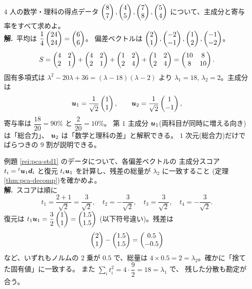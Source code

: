 \begin{rei}\label{rei:pca-std1}
$4$ 人の数学・理科の得点データ
$\begin{pmatrix}8 \\ 7\end{pmatrix}, \begin{pmatrix}4 \\ 5\end{pmatrix}, \begin{pmatrix}7 \\ 8\end{pmatrix}, \begin{pmatrix}5 \\ 4\end{pmatrix}$
について、主成分と寄与率をすべて求めよ。\\
\textbf{解.}\ 平均は $\dfrac{1}{4}\begin{pmatrix}24 \\ 24\end{pmatrix} = \begin{pmatrix}6 \\ 6\end{pmatrix}$。
偏差ベクトルは
$\begin{pmatrix}2 \\ 1\end{pmatrix}, \begin{pmatrix}-2 \\ -1\end{pmatrix}, \begin{pmatrix}1 \\ 2\end{pmatrix}, \begin{pmatrix}-1 \\ -2\end{pmatrix}$。
\[
S = \begin{pmatrix}4 & 2 \\ 2 & 1\end{pmatrix} + \begin{pmatrix}4 & 2 \\ 2 & 1\end{pmatrix}
+ \begin{pmatrix}1 & 2 \\ 2 & 4\end{pmatrix} + \begin{pmatrix}1 & 2 \\ 2 & 4\end{pmatrix}
= \begin{pmatrix}10 & 8 \\ 8 & 10\end{pmatrix}.
\]
固有多項式は $\lambda^2 - 20\lambda + 36 = (\lambda - 18)(\lambda - 2)$
より $\lambda_1 = 18$, $\lambda_2 = 2$。主成分は
\[
\bm{u}_1 = \frac{1}{\sqrt{2}}\begin{pmatrix}1 \\ 1\end{pmatrix}, \qquad
\bm{u}_2 = \frac{1}{\sqrt{2}}\begin{pmatrix}1 \\ -1\end{pmatrix},
\]
寄与率は $\dfrac{18}{20} = 90\%$ と $\dfrac{2}{20} = 10\%$。
第 $1$ 主成分 $\bm{u}_1$(両科目が同時に増える向き)は「総合力」、
$\bm{u}_2$ は「数学と理科の差」と解釈できる。
$1$ 次元(総合力)だけでばらつきの $9$ 割が説明できる。
\end{rei}

\begin{rei}[例題・標準(次元削減と残差の会計)]\label{rei:pca-std2}
例題 \ref{rei:pca-std1} のデータについて、各偏差ベクトルの
主成分スコア $t_i = {}^t\bm{u}_1\bm{d}_i$ と復元
$t_i\bm{u}_1$ を計算し、残差の総量が $\lambda_2$ に一致すること
(定理 \ref{thm:pca-decomp})を確かめよ。\\
\textbf{解.}\ スコアは順に
\[
t_1 = \frac{2 + 1}{\sqrt{2}} = \frac{3}{\sqrt{2}}, \quad
t_2 = -\frac{3}{\sqrt{2}}, \quad
t_3 = \frac{3}{\sqrt{2}}, \quad
t_4 = -\frac{3}{\sqrt{2}}.
\]
復元は $t_1\bm{u}_1 = \dfrac{3}{2}\begin{pmatrix}1 \\ 1\end{pmatrix} = \begin{pmatrix}1.5 \\ 1.5\end{pmatrix}$
(以下符号違い)。残差は
\[
\begin{pmatrix}2 \\ 1\end{pmatrix} - \begin{pmatrix}1.5 \\ 1.5\end{pmatrix} = \begin{pmatrix}0.5 \\ -0.5\end{pmatrix}
\]
など、いずれもノルムの $2$ 乗が $0.5$ で、総量は
$4 \times 0.5 = 2 = \lambda_2$。確かに「捨てた固有値」に一致する。
また $\sum_i t_i^2 = 4 \cdot \dfrac{9}{2} = 18 = \lambda_1$ で、
残した分散も勘定が合う。
\end{rei}

